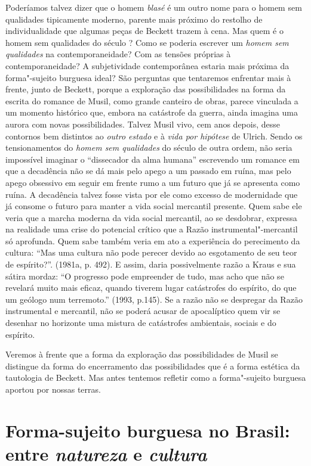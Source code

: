 {Poderíamos talvez dizer que o homem \emph{blasé} é um outro nome para o
homem sem qualidades tipicamente moderno, parente mais próximo do
restolho de individualidade que algumas peças de Beckett trazem à cena.
Mas quem é o homem sem qualidades do século ? Como se poderia
escrever um \emph{homem sem qualidades} na contemporaneidade? Com as
tensões próprias à contemporaneidade? A subjetividade contemporânea
estaria mais próxima da forma"-sujeito burguesa ideal? São perguntas que
tentaremos enfrentar mais à frente, junto de Beckett, porque a
exploração das possibilidades na forma da escrita do romance de Musil,
como grande canteiro de obras, parece vinculada a um momento histórico
que, embora na catástrofe da guerra, ainda imagina uma aurora com novas
possibilidades. Talvez Musil vivo, cem anos depois, desse contornos bem
distintos ao \emph{outro estado} e à \emph{vida por hipótese} de Ulrich.
Sendo os tensionamentos do \emph{homem sem qualidades} do século  de
outra ordem, não seria impossível imaginar o ``dissecador da alma
humana'' escrevendo um romance em que a decadência não se dá mais pelo
apego a um passado em ruína, mas pelo apego obsessivo em seguir em
frente rumo a um futuro que já se apresenta como ruína. A decadência
talvez fosse vista por ele como excesso de modernidade que já consome o
futuro para manter a vida social mercantil presente. Quem sabe ele veria que a
marcha moderna da vida social mercantil, ao se desdobrar, expressa na
realidade uma crise do potencial crítico que a Razão
instrumental"-mercantil só aprofunda. Quem sabe também veria em ato a
experiência do perecimento da cultura: ``Mas uma cultura não pode
perecer devido ao esgotamento de seu teor de espírito?''. (1981a, p.
492). E assim, daria possivelmente razão a Kraus e sua sátira mordaz:
``O progresso pode empreender de tudo, mas acho que não se revelará
muito mais eficaz, quando tiverem lugar catástrofes do espírito, do que
um geólogo num terremoto.'' (1993, p.145). Se a razão não se despregar
da Razão instrumental e mercantil, não se poderá acusar de apocalíptico
quem vir se desenhar no horizonte uma mistura de catástrofes ambientais,
sociais e do espírito.

Veremos à frente que a forma da exploração das possibilidades de Musil se
distingue da forma do encerramento das possibilidades que é a forma
estética da tautologia de Beckett. Mas antes tentemos refletir como a
forma"-sujeito burguesa aportou por nossas terras.

\chapter*{Forma-sujeito burguesa no Brasil: entre \emph{natureza} e \emph{cultura}}


}
